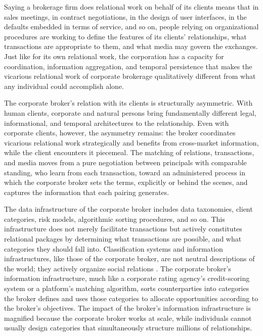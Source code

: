 \documentclass[
]{article}
\begin{document}
Saying a brokerage firm does relational work on behalf of its clients means that in sales meetings, in contract negotiations, in the design of user interfaces, in the defaults embedded in terms of service, and so on, people relying on organizational procedures are working to define the features of its clients' relationships, what transactions are appropriate to them, and what media may govern the exchanges. Just like for its own relational work, the corporation has a capacity for coordination, information aggregation, and temporal persistence that makes the vicarious relational work of corporate brokerage qualitatively different from what any individual could accomplish alone.

The corporate broker's relation with its clients is structurally asymmetric. With human clients, corporate and natural persons bring fundamentally different legal, informational, and temporal architectures to the relationship. Even with corporate clients, however, the asymmetry remains: the broker coordinates vicarious relational work strategically and benefits from cross-market information, while the client encounters it piecemeal. The matching of relations, transactions, and media moves from a pure negotiation between principals with comparable standing, who learn from each transaction, toward an administered process in which the corporate broker sets the terms, explicitly or behind the scenes, and captures the information that each pairing generates.

The data infrastructure of the corporate broker includes data taxonomies, client categories, risk models, algorithmic sorting procedures, and so on. This infrastructure does not merely facilitate transactions but actively constitutes relational packages by determining what transactions are possible, and what categories they should fall into. Classification systems and information infrastructures, like those of the corporate broker, are not neutral descriptions of the world; they actively organize social relations \autocite{fourcadeOrdinalSociety2024,geoffreyc.bowkerSortingThingsOut1999}. The corporate broker's information infrastructure, much like a corporate rating agency's credit-scoring system or a platform's matching algorithm, sorts counterparties into categories the broker defines and uses those categories to allocate opportunities according to the broker's objectives. The impact of the broker's information infrastructure is magnified because the corporate broker works at scale, while individuals cannot usually design categories that simultaneously structure millions of relationships.
\end{document}
